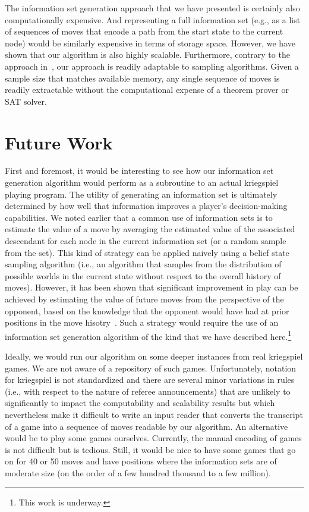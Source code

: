 \documentclass[11pt]{article}
\begin{document}
The information set generation approach that we have presented is certainly also computationally expensive.  And
representing a full information set (e.g., as a list of sequences of moves that encode a path from the start state to
the current node) would be similarly expensive in terms of storage space.  However, we have shown that our algorithm is
also highly scalable.  Furthermore, contrary to the approach in~\cite{nance06reasoning}, our approach is readily
adaptable to sampling algorithms.  Given a sample size that matches available memory, any single sequence of moves is
readily extractable without the computational expense of a theorem prover or SAT solver.

\section{Future Work}

First and foremost, it would be interesting to see how our information set generation algorithm would perform as a
subroutine to an actual kriegspiel playing program.  The utility of generating an information set is ultimately
determined by how well that information improves a player's decision-making capabilities.  We noted earlier that a
common use of information sets is to estimate the value of a move by averaging the estimated value of the associated
descendant for each node in the current information set (or a random sample from the set).  This kind of strategy can be
applied naively using a belief state sampling algorithm (i.e., an algorithm that samples from the distribution of
possible worlds in the current state without respect to the overall history of moves).  However, it has been shown that
significant improvement in play can be achieved by estimating the value of future moves from the perspective of the
opponent, based on the knowledge that the opponent would have had at prior positions in the move
hisotry~\cite{richards07opponent}.  Such a strategy would require the use of an information set generation algorithm of the
kind that we have described here.\footnote{This work is underway.}

Ideally, we would run our algorithm on some deeper instances from real kriegspiel games.  We are not aware of a
repository of such games.  Unfortunately, notation for kriegspiel is not standardized and there are several minor
variations in rules (i.e., with respect to the nature of referee announcements) that are unlikely to significantly to
impact the computability and scalability results but which nevertheless make it difficult to write an input reader that
converts the transcript of a game into a sequence of moves readable by our algorithm.  An alternative would be to play
some games ourselves.  Currently, the manual encoding of games is not difficult but is tedious.  Still, it would be nice
to have some games that go on for 40 or 50 moves and have positions where the information sets are of moderate size (on
the order of a few hundred thousand to a few million).
\end{document}
